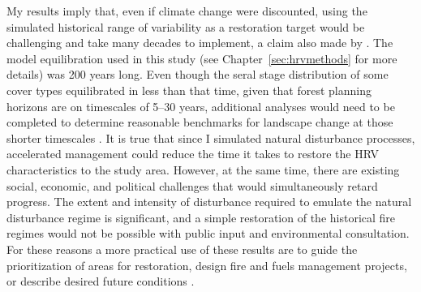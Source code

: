 My results imply that, even if climate change were discounted, using the simulated historical range of variability as a restoration target would be challenging and take many decades to implement, a claim also made by \citet{Collins2011}. The model equilibration used in this study (see Chapter~\ref{sec:hrvmethods} for more details) was 200 years long. Even though the seral stage distribution of some cover types equilibrated in less than that time, given that forest planning horizons are on timescales of 5--30 years, additional analyses would need to be completed to determine reasonable benchmarks for landscape change at those shorter timescales \citep{Millar1999,Millar2014}. It is true that since I simulated natural disturbance processes, accelerated management could reduce the time it takes to restore the HRV characteristics to the study area. However, at the same time, there are existing social, economic, and political challenges that would simultaneously retard progress. The extent and intensity of disturbance required to emulate the natural disturbance regime is significant, and a simple restoration of the historical fire regimes would not be possible with public input and environmental consultation. For these reasons a more practical use of these results are to guide the prioritization of areas for restoration, design fire and fuels management projects, or describe desired future conditions \citep{Keeley2000,Fule2008,Safford2014}.

